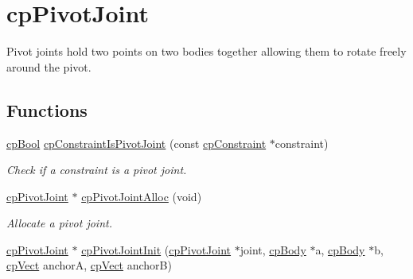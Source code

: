 \hypertarget{group__cp_pivot_joint}{}\section{cp\+Pivot\+Joint}
\label{group__cp_pivot_joint}


Pivot joints hold two points on two bodies together allowing them to rotate freely around the pivot.  


\subsection*{Functions}
\begin{DoxyCompactItemize}
\item 
\hypertarget{group__cp_pivot_joint_ga7d0141069828ec88194b06b1a7fc6a01}{}\hyperlink{group__basic_types_gabc5e752c48f3449ca26ef413ecbd647e}{cp\+Bool} \hyperlink{group__cp_pivot_joint_ga7d0141069828ec88194b06b1a7fc6a01}{cp\+Constraint\+Is\+Pivot\+Joint} (const \hyperlink{structcp_constraint}{cp\+Constraint} $\ast$constraint)\label{group__cp_pivot_joint_ga7d0141069828ec88194b06b1a7fc6a01}

\begin{DoxyCompactList}\small\item\em Check if a constraint is a pivot joint. \end{DoxyCompactList}\item 
\hypertarget{group__cp_pivot_joint_gac8ceffcbb474ba0ba021dee02eca5a09}{}\hyperlink{structcp_pivot_joint}{cp\+Pivot\+Joint} $\ast$ \hyperlink{group__cp_pivot_joint_gac8ceffcbb474ba0ba021dee02eca5a09}{cp\+Pivot\+Joint\+Alloc} (void)\label{group__cp_pivot_joint_gac8ceffcbb474ba0ba021dee02eca5a09}

\begin{DoxyCompactList}\small\item\em Allocate a pivot joint. \end{DoxyCompactList}\item 
\hypertarget{group__cp_pivot_joint_gab6d0dac0ef12606f9e537bc811bf8bcf}{}\hyperlink{structcp_pivot_joint}{cp\+Pivot\+Joint} $\ast$ \hyperlink{group__cp_pivot_joint_gab6d0dac0ef12606f9e537bc811bf8bcf}{cp\+Pivot\+Joint\+Init} (\hyperlink{structcp_pivot_joint}{cp\+Pivot\+Joint} $\ast$joint, \hyperlink{structcp_body}{cp\+Body} $\ast$a, \hyperlink{structcp_body}{cp\+Body} $\ast$b, \hyperlink{structcp_vect}{cp\+Vect} anchor\+A, \hyperlink{structcp_vect}{cp\+Vect} anchor\+B)\label{group__cp_pivot_joint_gab6d0dac0ef12606f9e537bc811bf8bcf}


\end{DoxyCompactItemize}
